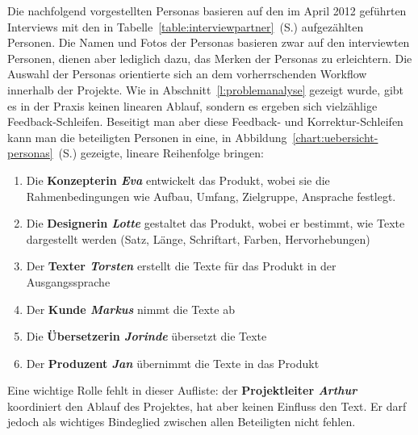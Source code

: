 Die nachfolgend vorgestellten Personas basieren auf den im April 2012 geführten Interviews mit den in Tabelle~\ref{table:interviewpartner}~(S.\pageref{table:interviewpartner}) aufgezählten Personen. Die Namen und Fotos der Personas basieren zwar auf den interviewten Personen, dienen aber lediglich dazu, das Merken der Personas zu erleichtern. Die Auswahl der Personas orientierte sich an dem vorherrschenden Workflow innerhalb der Projekte. Wie in Abschnitt~\ref{l:problemanalyse} gezeigt wurde, gibt es in der Praxis keinen linearen Ablauf, sondern es ergeben sich vielzählige Feedback-Schleifen. Beseitigt man aber diese Feedback- und Korrektur-Schleifen kann man die beteiligten Personen in eine, in Abbildung~\ref{chart:uebersicht-personas}~(S.\pageref{chart:uebersicht-personas}) gezeigte, lineare Reihenfolge bringen:
\begin{enumerate}\itemsep -5pt
\item Die \textbf{Konzepterin \emph{Eva}} entwickelt das Produkt, wobei sie die Rahmenbedingungen wie Aufbau, Umfang, Zielgruppe, Ansprache festlegt. 
\item Die \textbf{Designerin \emph{Lotte}} gestaltet das Produkt, wobei er bestimmt, wie Texte dargestellt werden (Satz, Länge, Schriftart, Farben, Hervorhebungen)
\item Der \textbf{Texter \emph{Torsten}} erstellt die Texte für das Produkt in der Ausgangssprache
\item Der \textbf{Kunde \emph{Markus}} nimmt die Texte ab
\item Die \textbf{Übersetzerin \emph{Jorinde}} übersetzt die Texte
\item Der \textbf{Produzent \emph{Jan}} übernimmt die Texte in das Produkt
\end{enumerate}

Eine wichtige Rolle fehlt in dieser Aufliste: der \textbf{Projektleiter \emph{Arthur}} koordiniert den Ablauf des Projektes, hat aber keinen Einfluss den Text. Er darf jedoch als wichtiges Bindeglied zwischen allen Beteiligten  nicht fehlen.

